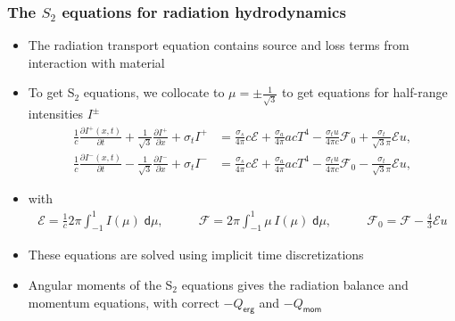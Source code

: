 \documentclass[xcolor=dvipsnames,fontsize=8pt]{beamer}
\newcommand{\E}{\mathcal{E}}
\newcommand{\F}{\mathcal{F}}
\newcommand{\colb}[1]{{\color{blue} #1}}
\newlength{\wideitemsep}
\let\olditem\item
\renewcommand{\item}{\setlength{\itemsep}{\wideitemsep}\olditem}
\newcommand{\pderiv}[2]{\frac{\partial #1}{\partial #2}}
\renewcommand{\d}{\mathsf{d}}
\begin{document}
\begin{frame}
    \frametitle{The $S_2$ equations for radiation hydrodynamics}
    \begin{itemize}
    \item The radiation transport equation contains source and loss terms from
        interaction with material
    \item To get S$_2$ equations, we collocate to $\mu=\pm\frac{1}{\sqrt{3}}$
        to get equations for half-range intensities $I^\pm$
        \begin{align*}
\frac{1}{c}\pderiv{I^+(x,t)}{t} + \frac{1}{\sqrt{3}}\pderiv{I^+}{x} + \sigma_t
I^+ &= 
\frac{\sigma_s}{4\pi} c\E + \frac{\sigma_a}{4\pi} acT^4  - \frac{\sigma_t u}{4\pi c}
\F_{0} +  
\frac{\sigma_t}{\sqrt{3}\pi}\E u,  \\
\frac{1}{c}\pderiv{I^-(x,t)}{t} - \frac{1}{\sqrt{3}}\pderiv{I^-}{x} + \sigma_t
I^- &= 
\frac{\sigma_s}{4\pi} c\E + \frac{\sigma_a}{4\pi} acT^4  - \frac{\sigma_t u}{4\pi c}
\F_{0} -  
\frac{\sigma_t}{\sqrt{3}\pi}\E u, 
\end{align*} 
    \item with
        \begin{align*}
        \E = \frac{1}{c}2\pi\int_{-1}^1\!\! I(\mu)\; \d \mu, \quad & \quad \F =
        2\pi\int_{-1}^1\!\! \mu\, I(\mu) \; \d \mu, \quad & \quad   \F_0 = \F - \frac{4}{3}\E u
        \end{align*}
    \item These equations are solved using \colb{implicit} time discretizations
    \item Angular moments of the S$_2$ equations gives the radiation balance
        and momentum equations, with correct $-Q_{\textsf{erg}}$ and $-Q_{\textsf{mom}}$
\end{itemize}
\end{frame}
\end{document}

